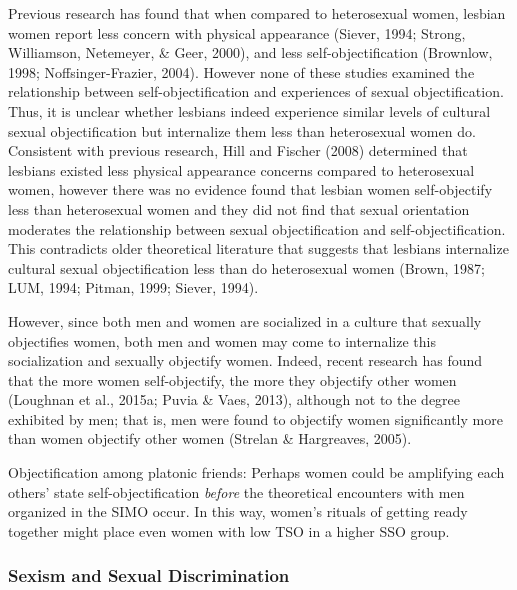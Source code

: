 \documentclass[man]{apa6}
\begin{document}
Previous research has found that when compared to heterosexual women,
lesbian women report less concern with physical appearance (Siever,
1994; Strong, Williamson, Netemeyer, \& Geer, 2000), and less
self-objectification (Brownlow, 1998; Noffsinger-Frazier, 2004). However
none of these studies examined the relationship between
self-objectification and experiences of sexual objectification. Thus, it
is unclear whether lesbians indeed experience similar levels of cultural
sexual objectification but internalize them less than heterosexual women
do. Consistent with previous research, Hill and Fischer (2008)
determined that lesbians existed less physical appearance concerns
compared to heterosexual women, however there was no evidence found that
lesbian women self-objectify less than heterosexual women and they did
not find that sexual orientation moderates the relationship between
sexual objectification and self-objectification. This contradicts older
theoretical literature that suggests that lesbians internalize cultural
sexual objectification less than do heterosexual women (Brown, 1987;
LUM, 1994; Pitman, 1999; Siever, 1994).

However, since both men and women are socialized in a culture that
sexually objectifies women, both men and women may come to internalize
this socialization and sexually objectify women. Indeed, recent research
has found that the more women self-objectify, the more they objectify
other women (Loughnan et al., 2015a; Puvia \& Vaes, 2013), although not
to the degree exhibited by men; that is, men were found to objectify
women significantly more than women objectify other women (Strelan \&
Hargreaves, 2005).

Objectification among platonic friends: Perhaps women could be
amplifying each others' state self-objectification \emph{before} the
theoretical encounters with men organized in the SIMO occur. In this
way, women's rituals of getting ready together might place even women
with low TSO in a higher SSO group.

\subsubsection{Sexism and Sexual
Discrimination}\label{sexism-and-sexual-discrimination}
\end{document}
